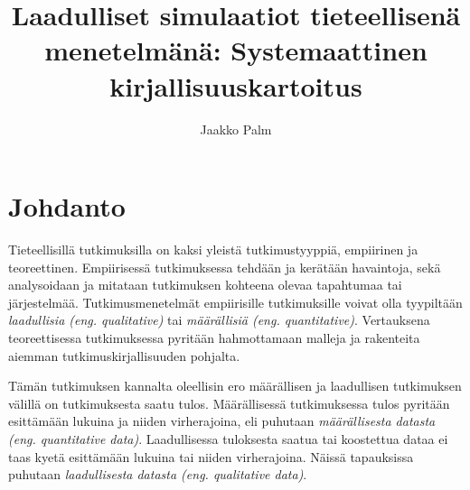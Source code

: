 \documentclass[utf8]{gradu3}
\begin{document}
\title{Laadulliset simulaatiot tieteellisenä menetelmänä: Systemaattinen kirjallisuuskartoitus}
\abstract{%
  
}

\author{Jaakko Palm}

\maketitle

\mainmatter

\chapter{Johdanto} \label{johdanto}
\begin{comment}
    Nämä ovat olleet ne perinteiset luokat. ainakin jotkut puhuvat laskennallisesta tieteestä kolmantena tutkimustyyppinä tai paradigmana. eli käytännössä teoreettisten mallien pohjalta rakennetuista numeerisista kokeista, joka pitkälti vastaa ainakin osaa tuosta määrällisestä simuloinnista
\end{comment}
Tieteellisillä tutkimuksilla on kaksi yleistä tutkimustyyppiä, empiirinen ja teoreettinen.
Empiirisessä tutkimuksessa tehdään  ja kerätään havaintoja, sekä analysoidaan 
ja mitataan tutkimuksen kohteena olevaa tapahtumaa tai järjestelmää. 
Tutkimusmenetelmät empiirisille tutkimuksille voivat olla 
tyypiltään \textit{laadullisia (eng. qualitative)} 
tai \textit{määrällisiä (eng. quantitative)}. 
Vertauksena teoreettisessa tutkimuksessa pyritään hahmottamaan 
malleja ja rakenteita aiemman tutkimuskirjallisuuden pohjalta. 

Tämän tutkimuksen kannalta oleellisin ero määrällisen ja laadullisen tutkimuksen 
välillä on tutkimuksesta saatu tulos.
Määrällisessä tutkimuksessa tulos pyritään esittämään lukuina ja niiden virherajoina,
eli puhutaan \textit{määrällisesta datasta (eng. quantitative data)}. 
Laadullisessa tuloksesta saatua tai koostettua dataa ei taas kyetä esittämään 
lukuina tai niiden virherajoina. Näissä tapauksissa puhutaan 
\textit{laadullisesta datasta (eng. qualitative data)}.
\end{document}
